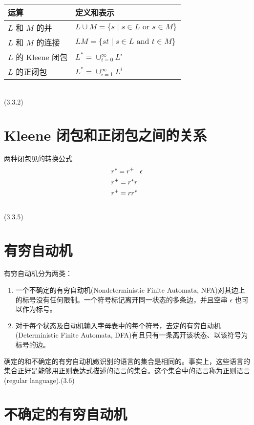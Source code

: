 \begin{tabular}{ll}
\toprule
运算 & 定义和表示 \\
\midrule
$L$ 和 $M$ 的并     &   $L\cup M = \{ s \mid  s \in L \text{ or } s \in M\}$ \\
$L$ 和 $M$ 的连接 &   $LM = \{ st \mid  s \in L \text{ and } t \in M \}$ \\
$L$ 的 Kleene 闭包 &   $L^{*} = \cup_{i=0}^{\infty} L^{i}$ \\
$L$ 的正闭包          &   $L^{*} = \cup_{i=1}^{\infty} L^{i}$ \\
\bottomrule
\end{tabular} \\
(3.3.2)


\section*{Kleene 闭包和正闭包之间的关系}

两种闭包见的转换公式
\begin{align}
& r^{*} = r^{+} \mid \epsilon \notag \\
& r^{+} = r^{*}r \notag \\
& r^{+}= rr^{*} \notag
\end{align}
\\
(3.3.5)


\section*{有穷自动机}

有穷自动机分为两类：
\begin{enumerate}
\item 一个不确定的有穷自动机(Nondeterministic Finite Automata, NFA)对其边上的标号没有任何限制。一个符号标记离开同一状态的多条边，并且空串 $\epsilon$ 也可以作为标号。
\item 对于每个状态及自动机输入字母表中的每个符号，去定的有穷自动机(Deterministic Finite Automata, DFA)有且只有一条离开该状态、以该符号为标号的边。
\end{enumerate}

确定的和不确定的有穷自动机嫩识别的语言的集合是相同的。事实上，这些语言的集合正好是能够用正则表达式描述的语言的集合。这个集合中的语言称为正则语言(regular language).(3.6)

\section*{不确定的有穷自动机}


